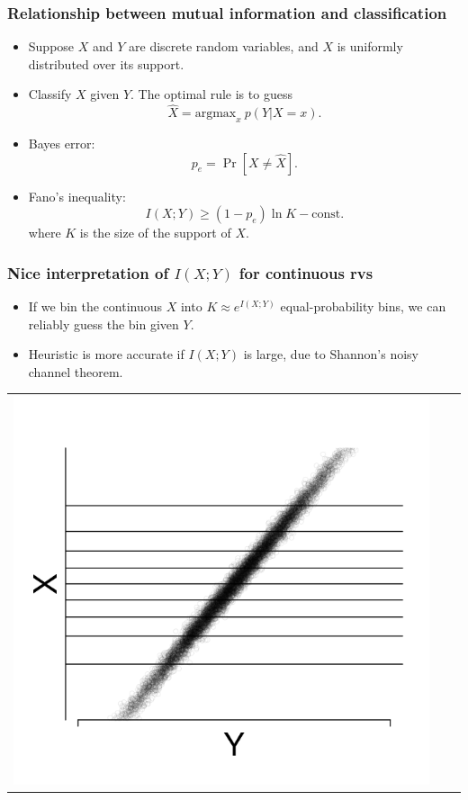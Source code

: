 \documentclass{beamer}
\newcommand{\argmax}{\text{argmax}}
\begin{document}
\begin{frame}
\frametitle{Relationship between mutual information and classification}
\begin{itemize}
\item Suppose $X$ and $Y$ are discrete random variables, and $X$ is uniformly distributed over its support.
\item Classify $X$ given $Y$.  The optimal rule is to guess
\[
\hat{X} = \argmax_x\ p(Y|X=x).
\]
\item Bayes error:
\[
p_e = \Pr[X \neq \hat{X}].
\]
\item Fano's inequality:
\[
I(X; Y) \geq (1-p_e) \ln K - \text{const.}
\]
where $K$ is the size of the support of $X$.
\end{itemize}
\end{frame}

\begin{frame}
\frametitle{Nice interpretation of $I(X; Y)$ for continuous rvs}
\begin{itemize}
\item If we bin the continuous $X$ into $K \approx e^{I(X; Y)}$ equal-probability bins,
we can reliably guess the bin given $Y$.
\item Heuristic is more accurate if $I(X; Y)$ is large, due to Shannon's noisy channel theorem.
\end{itemize}
\begin{center}
\begin{tabular}{ccc}
\includegraphics[scale = 0.23]{../info_theory_paper/bin_figure1.png} & &

\end{tabular}
\end{center}
\end{frame}
\end{document}
